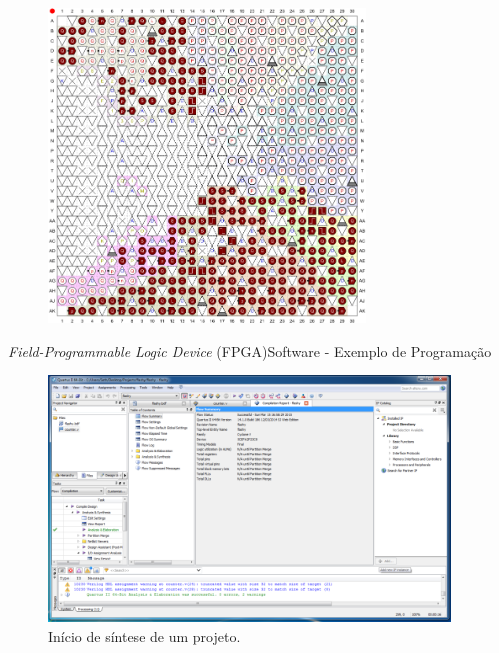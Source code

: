     	\begin{frame}%
            \vspace{-0.5em}
    		\begin{figure}[p]
    			\centering
    			\includegraphics[width=0.75\textwidth]{img/fpga/pinplanner.png}
                \vspace{-0.8em}
    			\label{fig:pinplanner}
    		\end{figure}
    	\end{frame}
    
    	\begin{frame}{\textit{Field-Programmable Logic Device} (FPGA)}{Software - Exemplo de Programação}
        \vspace{-0.5em}
    		\begin{figure}[p]
    			\centering
    			\includegraphics[width=0.95\textwidth]{img/fpga/software_quartus_compilation0.png}
                \vspace{-0.5em}
    			\caption{Início de síntese de um projeto.}
    			\label{fig:alteraquartus_comp0}
    		\end{figure}
    	\end{frame}
    
